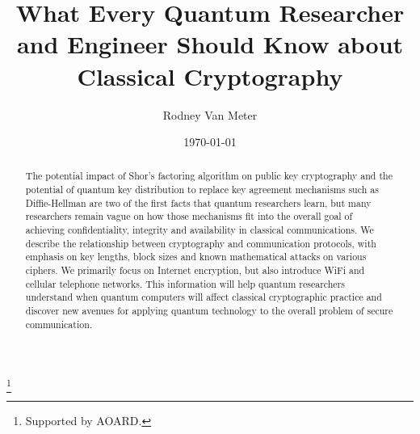\documentclass[%
 aip,
 jmp,%
 amsmath,amssymb,
 reprint,%
]{revtex4-1}
\def\comment#1{{\color{ForestGreen}$\Rightarrow${\small\em #1}}}
\begin{document}

\title[What Crypto]{What Every Quantum Researcher and Engineer Should Know about Classical Cryptography}%
\thanks{Supported by AOARD.}

\author{Rodney Van Meter}
%

\date{\today}%

\begin{abstract}
  The potential impact of Shor's factoring algorithm on public key
  cryptography and the potential of quantum key distribution to
  replace key agreement mechanisms such as Diffie-Hellman are two of
  the first facts that quantum researchers learn, but many researchers
  remain vague on how those mechanisms fit into the overall goal of
  achieving confidentiality, integrity and availability in classical
  communications.  We describe the relationship between cryptography
  and communication protocols, with emphasis on key lengths, block
  sizes and known mathematical attacks on various ciphers.  We
  primarily focus on Internet encryption, but also introduce WiFi and
  cellular telephone networks.  This information will help quantum
  researchers understand when quantum computers will affect classical
  cryptographic practice and discover new avenues for applying quantum
  technology to the overall problem of secure communication.
%
\end{abstract}

\maketitle

\tableofcontents{}
\end{document}
